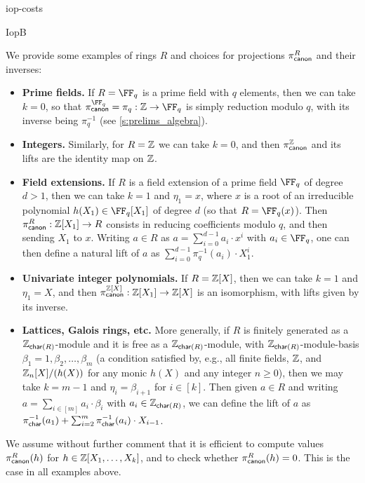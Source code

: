 \begin{lncsappendix}{iop-costs}
\begin{lncsmove}{IopB}
\begin{example}\label{e:presentations}
We provide some examples of rings $R$ and choices for  projections $\pi_{\mathsf{canon}}^R$ and their inverses: 
\begin{itemize}[leftmargin=*,nosep]
    \item \textbf{Prime fields.} If  $R=\FF_q$ is a prime field with $q$ elements, then we can take $k=0$, so that $\picanon^{\FF_q}=\pi_q:\ZZ \to \FF_q$ is simply reduction modulo $q$, with its inverse being $\pi_q^{-1}$ (see \cref{s:prelims_algebra}). 
    \item \textbf{Integers.} Similarly, for $R=\mathbb{Z}$ we can take $k=0$, and then $\pi_{\mathsf{canon}}^{\mathbb{Z}}$ and its lifts are the identity map on $\mathbb{Z}$.
\item \textbf{Field extensions.} If $R$ is a field extension of a prime field $\FF_q$ of degree $d>1$, then we can  take $k=1$ and $\eta_1 = x$, where $x$ is a root of an irreducible polynomial $h(X_1)\in \FF_{q}[X_1]$ of degree $d$ (so that $R=\FF_q(x)$). Then $\pi_{\mathsf{canon}}^R:\mathbb{Z}[X_1]\to R$ consists in reducing coefficients modulo $q$, and then sending $X_1$ to $x$. Writing $a\in R$ as $a=\sum_{i=0}^{d-1} a_i\cdot x^{i}$ with $a_i\in \FF_q$, one can then define a natural lift of $a$ as $\sum_{i=0}^{d-1} \pi_q^{-1}(a_i)\cdot X_1^{i}$.
\item \textbf{Univariate integer polynomials.} If $R=\mathbb{Z}[X]$, then we can take $k=1$ and $\eta_1=X$, and then $\pi_{\mathsf{canon}}^{\mathbb{Z}[X]}:\mathbb{Z}[X_1]\to \mathbb{Z}[X]$ is an isomorphism, with lifts given by its inverse.
\item \textbf{Lattices, Galois rings, etc.} More generally, if $R$ is finitely generated as a $\mathbb{Z}_{\mathsf{char}(R)}$-module and it is free as a $\mathbb{Z}_{\mathsf{char}(R)}$-module, with  $\mathbb{Z}_{\mathsf{char}(R)}$-module-basis $\beta_1=1, \beta_2, \ldots, \beta_m$ (a condition satisfied by, e.g., all finite fields, $\mathbb{Z}$, and $\mathbb{Z}_n[X]/(h(X))$ for any monic $h(X)$ and any integer $n\geq 0$), then we may take $k=m-1$ and $\eta_i=\beta_{i+1}$ for $i\in [k]$. Then given $a\in R$ and writing $a=\sum_{i\in [m]} a_i\cdot \beta_i$ with $a_i\in \mathbb{Z}_{\mathsf{char}(R)}$, we can define the lift of $a$ as $\pi_{\mathsf{char}}^{-1}(a_1) + \sum_{i=2}^{m}\pi_{\mathsf{char}}^{-1}(a_i)\cdot X_{i-1}$.
\end{itemize}
\end{example}


We assume without further comment that it is efficient to compute  values $\pi_{\mathsf{canon}}^R(h)$  for $h\in \mathbb{Z}[X_1,\ldots, X_k]$, and to check whether  $\pi_{\mathsf{canon}}^R(h)=0$.   This is the case in all examples above.






\end{lncsmove}
\end{lncsappendix}
